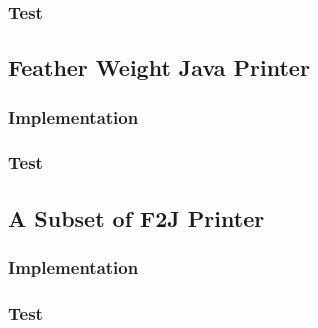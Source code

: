 \subsubsection{Test}

\subsection{Feather Weight Java Printer}

\subsubsection{Implementation}

\subsubsection{Test}

\subsection{A Subset of F2J Printer}

\subsubsection{Implementation}

\subsubsection{Test}



